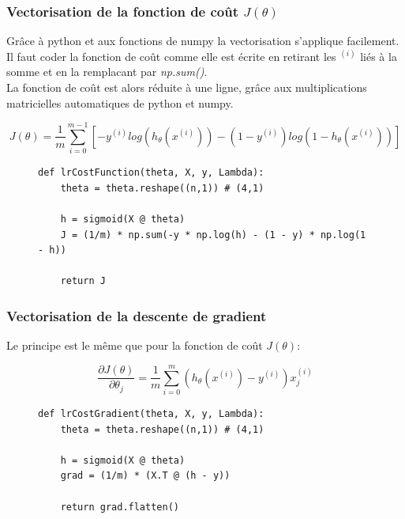 \subsubsection{Vectorisation de la fonction de coût $J(\theta)$}

Grâce à python et aux fonctions de numpy la vectorisation s'applique facilement. Il faut coder la fonction de coût comme elle est écrite en retirant les $^{(i)}$ liés à la somme et en la remplacant par \textit{np.sum()}. \\
La fonction de coût est alors réduite à une ligne, grâce aux multiplications matricielles automatiques de python et numpy.

\begin{equation}\label{eq:cout}
    J(\theta) = \frac{1}{m} \sum_{i=0}^{m-1}[-y^{(i)} log(h_\theta(x^{(i)})) - (1-y^{(i)}) log(1-h_\theta(x^{(i)}))]
\end{equation}

\begin{figure}[!h]
\begin{verbatim}
def lrCostFunction(theta, X, y, Lambda):
    theta = theta.reshape((n,1)) # (4,1)
 
    h = sigmoid(X @ theta)
    J = (1/m) * np.sum(-y * np.log(h) - (1 - y) * np.log(1 - h))
      
    return J
\end{verbatim}   
\end{figure}

\subsubsection{Vectorisation de la descente de gradient}
\noindent
Le principe est le même que pour la fonction de coût $J(\theta)$:

\begin{equation}\label{eq:descente-gradient}
    \frac{\partial J(\theta)}{\partial \theta_j} = \frac{1}{m} \sum_{i=0}^{m} (h_\theta(x^{(i)}) - y^{(i)}) x_j^{(i)}
\end{equation}

\begin{figure}[!h]
\begin{verbatim}
def lrCostGradient(theta, X, y, Lambda):
    theta = theta.reshape((n,1)) # (4,1)

    h = sigmoid(X @ theta)
    grad = (1/m) * (X.T @ (h - y))

    return grad.flatten()
\end{verbatim}   
\end{figure}


